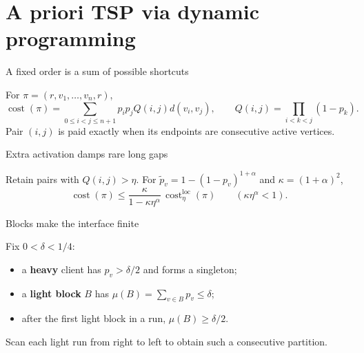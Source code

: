 \documentclass[aspectratio=169,12pt]{beamer}
\newcommand{\cost}{\operatorname{cost}}
\newcommand{\1}{\mathbf{1}}
\begin{document}
\section{A priori TSP via dynamic programming}

\begin{frame}{A fixed order is a sum of possible shortcuts}
  \centering
  \resizebox{0.83\linewidth}{!}{\StPairwiseShortcut}

  \vspace{0.04cm}
  For \(\pi=(r,v_1,\ldots,v_n,r)\),
  {\fontsize{12.3pt}{14.8pt}\selectfont
  \[
    \cost(\pi)
    =
    \sum_{0\le i<j\le n+1}
      p_i p_j Q(i,j)d(v_i,v_j),
    \qquad
    Q(i,j)=\prod_{i<k<j}(1-p_k).
  \]}
  \small Pair \((i,j)\) is paid exactly when its endpoints are consecutive
  active vertices.
\end{frame}

\begin{frame}{Extra activation damps rare long gaps}
  \centering
  \resizebox{0.83\linewidth}{!}{\StActivationInflation}

  \vspace{0.04cm}
  Retain pairs with \(Q(i,j)>\eta\). For
  \(\widetilde p_v=1-(1-p_v)^{1+\alpha}\) and
  \(\kappa=(1+\alpha)^2\),
  \[
    \cost(\pi)
    \le
    \frac{\kappa}{1-\kappa\eta^\alpha}\,
    \cost^{\mathrm{loc}}_\eta(\pi)
    \qquad(\kappa\eta^\alpha<1).
  \]
\end{frame}

\begin{frame}{Blocks make the interface finite}
  \centering
  \resizebox{0.92\linewidth}{!}{\StBlockStrip}

  \vspace{0.12cm}
  Fix \(0<\delta<1/4\):
  \begin{itemize}
    \item a \textbf{heavy} client has \(p_v>\delta/2\) and forms a singleton;
    \item a \textbf{light block} \(B\) has
      \(\mu(B)=\sum_{v\in B}p_v\le\delta\);
    \item after the first light block in a run,
      \(\mu(B)\ge\delta/2\).
  \end{itemize}
  Scan each light run from right to left to obtain such a consecutive
  partition.
\end{frame}
\end{document}

